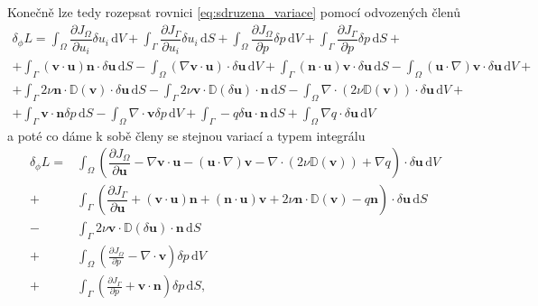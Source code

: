 Konečně lze tedy rozepsat rovnici \ref{eq:sdruzena_variace} pomocí odvozených členů
\begin{multline*}
\delta_\phi L = 
\int_{\Omega} \dfrac{\partial J_{\Omega}}{\partial u_i} \delta u_i \, \mathrm{d}V 
+ 
\int_{\Gamma} \dfrac{\partial J_{\Gamma}}{\partial u_i} \delta u_i \, \mathrm{d}S
+
\int_{\Omega} \dfrac{\partial J_{\Omega}}{\partial p} \delta p  \, \mathrm{d}V 
+ 
\int_{\Gamma} \dfrac{\partial J_{\Gamma}}{\partial p} \delta p  \, \mathrm{d}S
+\\+
\int_{\Gamma} 
(\mathbf{v}\cdot \mathbf{u} )\mathbf{n} \cdot \delta\mathbf{u}
\, \mathrm{d}S
-
\int_{\Omega} 
(\nabla \mathbf{v}\cdot \mathbf{u})\cdot\delta \mathbf{u}
\, \mathrm{d}V
+
\int_{\Gamma} 
(\mathbf{n} \cdot \mathbf{u}) \mathbf{v}\cdot \delta \mathbf{u} 
\, \mathrm{d}S
-
\int_{\Omega} 
(\mathbf{u} \cdot \nabla)\mathbf{v}\cdot \delta \mathbf{u}
\, \mathrm{d}V
+\\+
\int_{\Gamma} 
2\nu \mathbf{n} \cdot  \mathbb{D}(\mathbf{v})\cdot \delta \mathbf{u}
\, \mathrm{d}S
- \int_{\Gamma} 
2\nu \mathbf{v} \cdot  \mathbb{D}(\delta \mathbf{u})\cdot \mathbf{n}
\, \mathrm{d}S
-
\int_{\Omega} 
\nabla \cdot \left( 2\nu \mathbb{D}(\mathbf{v}) \right) \cdot \delta \mathbf{u}
\, \mathrm{d}V
+\\+
\int_{\Gamma} 
\mathbf{v}\cdot \mathbf{n} \delta p 
\, \mathrm{d}S
-
\int_{\Omega} 
\nabla \cdot \mathbf{v} \delta p
\, \mathrm{d}V
+
\int_{\Gamma} 
- q \delta \mathbf{u \cdot n}
\, \mathrm{d}S
+
\int_{\Omega} 
\nabla q \cdot \delta \mathbf{u}
\, \mathrm{d}V
\end{multline*}
a poté co dáme k sobě členy se stejnou variací a typem integrálu
\begin{align*}
\delta_\phi L = 
&\int_{\Omega} 
\left(
\dfrac{\partial J_{\Omega}}{\partial \mathbf{u}}
- \nabla \mathbf{v}\cdot \mathbf{u}
- (\mathbf{u} \cdot \nabla)\mathbf{v}
- \nabla \cdot \left( 2\nu \mathbb{D}(\mathbf{v}) \right)
+ \nabla q
\right)
\cdot \delta \mathbf{u}
\, \mathrm{d}V
\\+
&\int_{\Gamma}
\left(
\dfrac{\partial J_{\Gamma}}{\partial \mathbf{u}}
+ (\mathbf{v}\cdot \mathbf{u} )\mathbf{n} 
+ (\mathbf{n} \cdot \mathbf{u}) \mathbf{v}
+ 2\nu \mathbf{n} \cdot  \mathbb{D}(\mathbf{v})
- q \mathbf{n}
\right)
\cdot \delta \mathbf{u}
\, \mathrm{d}S
\\-
&\int_{\Gamma} 
2\nu \mathbf{v} \cdot  \mathbb{D}(\delta \mathbf{u})\cdot \mathbf{n}
\, \mathrm{d}S
\\+
&\int_{\Omega} 
\left(
\frac{\partial J_\Omega}{\partial p}
- \nabla \cdot \mathbf{v}
\right)
\delta p
\, \mathrm{d}V
\\+
&\int_{\Gamma}
\left(
\frac{\partial J_\Gamma}{\partial p}
+ \mathbf{v} \cdot \mathbf{n}
\right)
 \delta p
\, \mathrm{d}S,
\end{align*}
